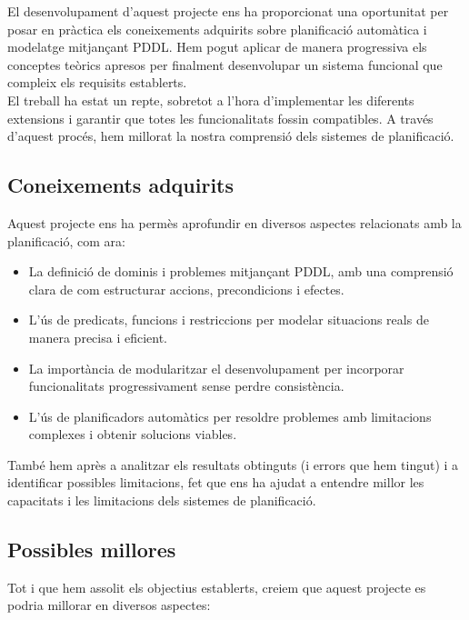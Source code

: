 \documentclass[a4paper]{article}
\begin{document}
	El desenvolupament d'aquest projecte ens ha proporcionat una oportunitat per posar en pràctica els coneixements adquirits sobre planificació automàtica i modelatge mitjançant PDDL. Hem pogut aplicar de manera progressiva els conceptes teòrics apresos per finalment desenvolupar un sistema funcional que compleix els requisits establerts.\\ 
	
	El treball ha estat un repte, sobretot a l'hora d'implementar les diferents extensions i garantir que totes les funcionalitats fossin compatibles. A través d'aquest procés, hem millorat la nostra comprensió dels sistemes de planificació.
	
	\subsection{Coneixements adquirits}
	
	Aquest projecte ens ha permès aprofundir en diversos aspectes relacionats amb la planificació, com ara:
	\begin{itemize}
		\item La definició de dominis i problemes mitjançant PDDL, amb una comprensió clara de com estructurar accions, precondicions i efectes.
		\item L'ús de predicats, funcions i restriccions per modelar situacions reals de manera precisa i eficient.
		\item La importància de modularitzar el desenvolupament per incorporar funcionalitats progressivament sense perdre consistència.
		\item L'ús de planificadors automàtics per resoldre problemes amb limitacions complexes i obtenir solucions viables.
	\end{itemize}
	
	També hem après a analitzar els resultats obtinguts (i errors que hem tingut) i a identificar possibles limitacions, fet que ens ha ajudat a entendre millor les capacitats i les limitacions dels sistemes de planificació.
		
	\subsection{Possibles millores}	

	Tot i que hem assolit els objectius establerts, creiem que aquest projecte es podria millorar en diversos aspectes:
	
\end{document}
